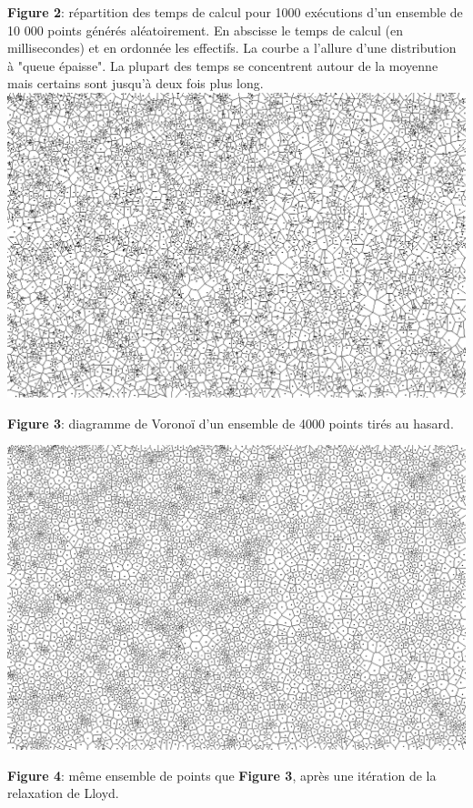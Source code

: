 \documentclass[a4paper, 10pt]{article}
\begin{document}
\begin{center}
\textbf{Figure 2}: répartition des temps de calcul pour 1000 exécutions d'un ensemble de 10 000 points générés aléatoirement. En abscisse le temps de calcul (en millisecondes) et en ordonnée les effectifs. La courbe a l'allure d'une distribution à "queue épaisse". La plupart des temps se concentrent autour de la moyenne mais certains sont jusqu'à deux fois plus long.  
\newpage
\includegraphics[scale=0.2]{Lloyd0.png}
  
\textbf{Figure 3}: diagramme de Voronoï d'un ensemble de 4000 points tirés au hasard.  
  
\includegraphics[scale=0.2]{Lloyd1.png}
  
\textbf{Figure 4}: même ensemble de points que \textbf{Figure 3}, après une itération de la relaxation de Lloyd.  
  

\end{center}
\end{document}
